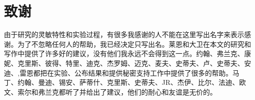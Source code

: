 \chapter*{致谢}

由于研究的灵敏特性和实验过程，有很多我感谢的人不能在这里写出名字来表示感谢。为了不忽略任何人的帮助，我已经决定只写出名。莱恩和大卫在本文的研究和写作中提供了许多好的建议，没有他们我永远不会得到这一点。约翰、弗兰克、康妮、克里斯、彼得、特里、迪克、杰罗姆、迈克、麦夫、史蒂夫、卢、史蒂夫、安迪、,雷恩都把在实验、公布结果和提供秘密支持工作中提供了很多的帮助。马丁、约翰、曼迪、锡安、萨蒂什、克里斯、史蒂夫、JR、杰伊、比尔、法迪、欧文、索尔和弗兰克都听了并给出了建议，他们的耐心和友谊是无价的。

\cleardoublepage

